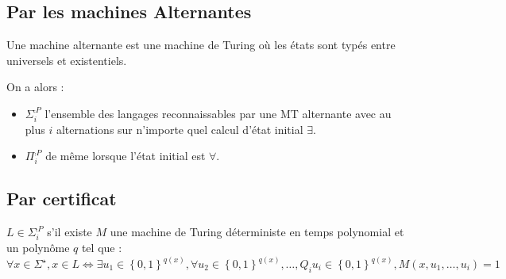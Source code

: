 \documentclass{cours}
\begin{document}
\subsection{Par les machines Alternantes}
\begin{definition}
    Une machine alternante est une machine de Turing où les états sont typés entre universels et existentiels.
\end{definition}

\begin{proposition}
    On a alors : 
    \begin{itemize}
        \item $\Sigma_{i}^{\comp{P}}$ l'ensemble des langages reconnaissables par une MT alternante avec au plus $i$ alternations sur n'importe quel calcul d'état initial $\exists$.
        \item $\Pi_{i}^{\comp{P}}$ de même lorsque l'état initial est $\forall$.
    \end{itemize}
\end{proposition}

\subsection{Par certificat}
\begin{proposition}
    $L \in \Sigma_{i}^{\comp{P}}$ s'il existe $M$ une machine de Turing déterministe en temps polynomial et un polynôme $q$ tel que : 
    \[
        \forall x \in \Sigma^{\star}, x \in L \Leftrightarrow \exists u_{1} \in \left\{0, 1\right\}^{q(x)}, \forall u_{2} \in \left\{0, 1\right\}^{q(x)}, \ldots, Q_{i}u_{i} \in \left\{0, 1\right\}^{q(x)}, M(x, u_{1}, \ldots, u_{i}) = 1
    \]
\end{proposition}
\end{document}
